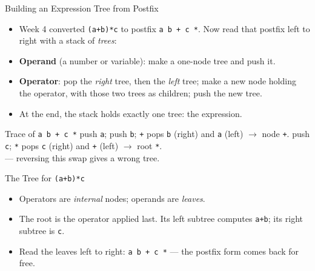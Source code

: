 \documentclass[aspectratio=169]{beamer}
\begin{document}
\begin{frame}{Building an Expression Tree from Postfix}
  \begin{itemize}
    \item Week 4 converted \texttt{(a+b)*c} to postfix \texttt{a b + c *}.
      Now read that postfix left to right with a stack of \emph{trees}:
    \item \textbf{Operand} (a number or variable): make a one-node tree and
      push it.
    \item \textbf{Operator}: pop the \emph{right} tree, then the \emph{left}
      tree; make a new node holding the operator, with those two trees as
      children; push the new tree.
    \item At the end, the stack holds exactly one tree: the expression.
  \end{itemize}
  \begin{exampleblock}{Trace of \texttt{a b + c *}}
    push \texttt{a}; push \texttt{b}; \texttt{+} pops \texttt{b} (right) and
    \texttt{a} (left) $\to$ node \texttt{+}. push \texttt{c}; \texttt{*}
    pops \texttt{c} (right) and \texttt{+} (left) $\to$ root \texttt{*}. \\
     --- reversing this swap gives a wrong tree.
  \end{exampleblock}
\end{frame}

\begin{frame}{The Tree for \texttt{(a+b)*c}}
  \begin{center}
  \end{center}
  \begin{itemize}
    \item Operators are \emph{internal} nodes; operands are \emph{leaves}.
    \item The root is the operator applied last. Its left subtree computes
      \texttt{a+b}; its right subtree is \texttt{c}.
    \item Read the leaves left to right: \texttt{a b + c *} --- the postfix
      form comes back for free.
  \end{itemize}
\end{frame}
\end{document}
